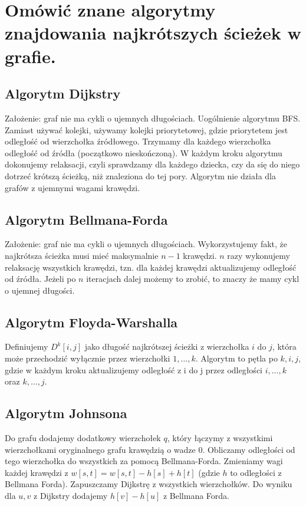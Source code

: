 \section{Omówić znane algorytmy znajdowania najkrótszych ścieżek w grafie.}

\subsection{Algorytm Dijkstry}
Założenie: graf nie ma cykli o ujemnych długościach.
Uogólnienie algorytmu BFS.
Zamiast używać kolejki, używamy kolejki priorytetowej, gdzie priorytetem jest odległość od wierzchołka źródłowego.
Trzymamy dla każdego wierzchołka odległość od źródła (początkowo nieskończoną).
W każdym kroku algorytmu dokonujemy relaksacji, czyli sprawdzamy dla każdego dziecka,
czy da się do niego dotrzeć krótszą ścieżką, niż znaleziona do tej pory.
Algorytm nie działa dla grafów z ujemnymi wagami krawędzi.

\subsection{Algorytm Bellmana-Forda}
Założenie: graf nie ma cykli o ujemnych długościach.
Wykorzystujemy fakt, że najkrótsza ścieżka musi mieć maksymalnie $n-1$ krawędzi.
$n$ razy wykonujemy relaksację wszystkich krawędzi, tzn. dla każdej krawędzi aktualizujemy odległość od źródła.
Jeżeli po $n$ iteracjach dalej możemy to zrobić, to znaczy że mamy cykl o ujemnej długości.

\subsection{Algorytm Floyda-Warshalla}
Definiujemy $D^k[i, j]$ jako długość najkrótszej ścieżki z wierzchołka $i$ do $j$,
która może przechodzić wyłącznie przez wierzchołki $1,\ldots,k$.
Algorytm to pętla po $k, i, j$, gdzie w każdym kroku aktualizujemy odległość z i do j przez odległości $i,\ldots,k$ oraz $k,\ldots,j$.

\subsection{Algorytm Johnsona}
Do grafu dodajemy dodatkowy wierzchołek $q$,
który łączymy z wszystkimi wierzchołkami oryginalnego grafu krawędzią o wadze $0$.
Obliczamy odległości od tego wierzchołka do wszystkich za pomocą Bellmana-Forda.
Zmieniamy wagi każdej krawędzi z $w[s, t] = w[s, t] - h[s] + h[t]$ (gdzie $h$ to odległości z Bellmana Forda).
Zapuszczamy Dijkstrę z wszystkich wierzchołków.
Do wyniku dla $u, v$ z Dijkstry dodajemy $h[v] - h[u]$ z Bellmana Forda.

